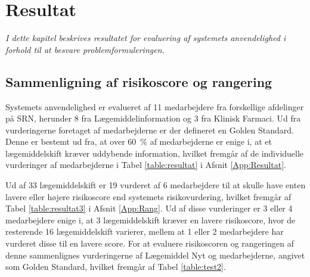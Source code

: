 \chapter{Resultat}
\vspace{-0.3cm}
\textit{I dette kapitel beskrives resultatet for evaluering af systemets anvendelighed i forhold til at besvare problemformuleringen.}

\section{Sammenligning af risikoscore og rangering}
Systemets anvendelighed er evalueret af 11 medarbejdere fra forskellige afdelinger på SRN, herunder 8 fra Lægemiddelinformation og 3 fra Klinisk Farmaci. Ud fra vurderingerne foretaget af medarbejderne er der defineret en Golden Standard. Denne er bestemt ud fra, at over 60~\% af medarbejderne er enige i, at et lægemiddelskift kræver uddybende information, hvilket fremgår af de individuelle vurderinger af medarbejderne i Tabel \ref{table:resultat} i Afsnit \ref{App:Resultat}.

Ud af 33 lægemiddelskift er 19 vurderet af 6 medarbejdere til at skulle have enten lavere eller højere risikoscore end systemets risikovurdering, hvilket fremgår af Tabel \ref{table:resultat3} i Afsnit \ref{App:Rang}. Ud af disse vurderinger er 3 eller 4 medarbejdere enige i, at 3 lægemiddelskift kræver en lavere risikoscore, hvor de resterende 16 lægemiddelskift varierer, mellem at 1 eller 2 medarbejdere har vurderet disse til en lavere score. %
For at evaluere risikoscoren og rangeringen af denne sammenlignes vurderingerne af Lægemiddel Nyt og medarbejderne, angivet som Golden Standard, hvilket fremgår af Tabel \ref{table:test2}. 

